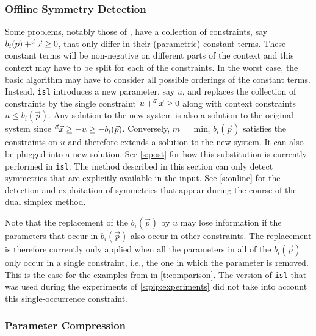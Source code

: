 \subsubsection{Offline Symmetry Detection}\label{s:offline}

Some problems, notably those of \textcite{Bygde2010licentiate},
have a collection of constraints, say
$b_i(\vec p) + \sp {\vec a} {\vec x} \ge 0$,
that only differ in their (parametric) constant terms.
These constant terms will be non-negative on different parts
of the context and this context may have to be split for each
of the constraints.  In the worst case, the basic algorithm may
have to consider all possible orderings of the constant terms.
Instead, {\tt isl} introduces a new parameter, say $u$, and
replaces the collection of constraints by the single
constraint $u + \sp {\vec a} {\vec x} \ge 0$ along with
context constraints $u \le b_i(\vec p)$.
Any solution to the new system is also a solution
to the original system since
$\sp {\vec a} {\vec x} \ge -u \ge -b_i(\vec p)$.
Conversely, $m = \min_i b_i(\vec p)$ satisfies the constraints
on $u$ and therefore extends a solution to the new system.
It can also be plugged into a new solution.
See \autoref{s:post} for how this substitution is currently performed
in {\tt isl}.
The method described in this section can only detect symmetries
that are explicitly available in the input.
See \autoref{s:online} for the detection
and exploitation of symmetries that appear during the course of
the dual simplex method.

Note that the replacement of the $b_i(\vec p)$ by $u$ may lose
information if the parameters that occur in $b_i(\vec p)$ also
occur in other constraints.  The replacement is therefore currently
only applied when all the parameters in all of the $b_i(\vec p)$
only occur in a single constraint, i.e., the one in which
the parameter is removed.
This is the case for the examples from \textcite{Bygde2010licentiate}
in \autoref{t:comparison}.
The version of {\tt isl} that was used during the experiments
of \autoref{s:pip:experiments} did not take into account
this single-occurrence constraint.

\subsubsection{Parameter Compression}\label{s:compression}

